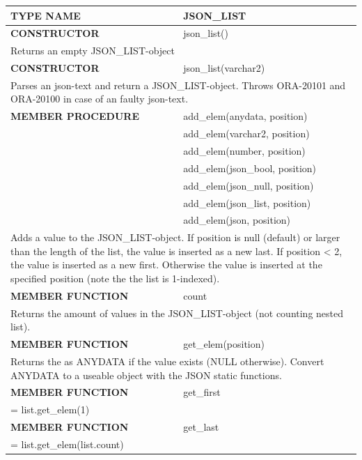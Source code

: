 \documentclass[11pt,twocolumn, a4paper]{article}
\begin{document}
\begin{longtable}{| l | l |}

\hline
  \rowcolor{gray}\color{white}
  \textbf{TYPE NAME} & \color{white}\textbf{JSON\_LIST} \\
\hline

\hline
  \textbf{CONSTRUCTOR} & json\_list()\\
\hline
  \multicolumn{2}{|p{15cm}|}{Returns an empty JSON\_LIST-object} \\
\hline

\hline
  \textbf{CONSTRUCTOR} & json\_list(varchar2)\\
\hline
  \multicolumn{2}{|p{15cm}|}{Parses an json-text and return a JSON\_LIST-object. 
Throws ORA-20101 and ORA-20100 in case of an faulty json-text.} \\
\hline

\hline
  \textbf{MEMBER PROCEDURE} & add\_elem(anydata, position)\\
& add\_elem(varchar2, position)\\
& add\_elem(number, position)\\
& add\_elem(json\_bool, position)\\
& add\_elem(json\_null, position)\\
& add\_elem(json\_list, position)\\
& add\_elem(json, position)\\
\hline
  \multicolumn{2}{|p{15cm}|}{Adds a value to the JSON\_LIST-object. If position is null (default) or larger than the length of the list, the value is inserted as a new last. If position < 2, the value is inserted as a new first. Otherwise the value is inserted at the specified position (note the the list is 1-indexed).} \\
\hline

\hline
  \textbf{MEMBER FUNCTION} & count\\
\hline
  \multicolumn{2}{|p{15cm}|}{Returns the amount of values in the JSON\_LIST-object (not counting nested list).} \\
\hline

\hline
  \textbf{MEMBER FUNCTION} & get\_elem(position)\\
\hline
  \multicolumn{2}{|p{15cm}|}{Returns the as ANYDATA if the value exists (NULL otherwise). Convert ANYDATA to a useable object with the JSON static functions.} \\
\hline

\hline
  \textbf{MEMBER FUNCTION} & get\_first\\
\hline
  \multicolumn{2}{|p{15cm}|}{ = list.get\_elem(1)} \\
\hline
\hline
  \textbf{MEMBER FUNCTION} & get\_last\\
\hline
  \multicolumn{2}{|p{15cm}|}{ = list.get\_elem(list.count)} \\
\hline


\end{longtable}
\end{document}
